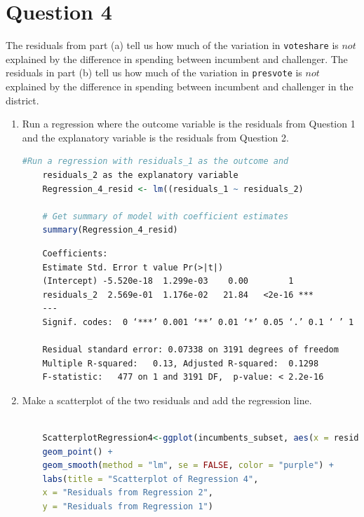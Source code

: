 \documentclass[12pt,letterpaper]{article}
\begin{document}
\section*{Question 4}
\noindent The residuals from part (a) tell us how much of the variation in \texttt{voteshare} is $not$ explained by the difference in spending between incumbent and challenger. The residuals in part (b) tell us how much of the variation in \texttt{presvote} is $not$ explained by the difference in spending between incumbent and challenger in the district.
	\begin{enumerate}
		\item Run a regression where the outcome variable is the residuals from Question 1 and the explanatory variable is the residuals from Question 2.	\vspace{0cm}
		
	\begin{lstlisting}[language=R, caption={Regression Model 4 in R}, label={lst:regression_model}]
	#Run a regression with residuals_1 as the outcome and
	residuals_2 as the explanatory variable
	Regression_4_resid <- lm((residuals_1 ~ residuals_2)
	
	# Get summary of model with coefficient estimates
	summary(Regression_4_resid)
	\end{lstlisting}

\begin{verbatim}
	Coefficients:
	Estimate Std. Error t value Pr(>|t|)    
	(Intercept) -5.520e-18  1.299e-03    0.00        1    
	residuals_2  2.569e-01  1.176e-02   21.84   <2e-16 ***
	---
	Signif. codes:  0 ‘***’ 0.001 ‘**’ 0.01 ‘*’ 0.05 ‘.’ 0.1 ‘ ’ 1
	
	Residual standard error: 0.07338 on 3191 degrees of freedom
	Multiple R-squared:   0.13,	Adjusted R-squared:  0.1298 
	F-statistic:   477 on 1 and 3191 DF,  p-value: < 2.2e-16
\end{verbatim}
		
	\item Make a scatterplot of the two residuals and add the regression line. 	\vspace{0cm}
		
	\begin{lstlisting}[language=R, caption={Scatterplot 3 code in R}, label={lst:regression_model}]
		
	ScatterplotRegression4<-ggplot(incumbents_subset, aes(x = residuals_2, y = residuals_1)) +
	geom_point() +
	geom_smooth(method = "lm", se = FALSE, color = "purple") +
	labs(title = "Scatterplot of Regression 4",
	x = "Residuals from Regression 2",
	y = "Residuals from Regression 1")
	

\end{lstlisting}
\end{enumerate}
\end{document}
